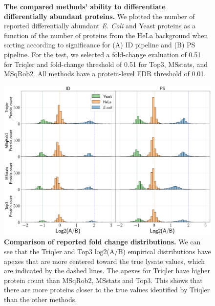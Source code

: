 \documentclass[11pt]{article}
\begin{document}
\begin{figure}[hbt]
\begin{tabular}{lclc}
    \end{tabular}
    \caption{{\bf The compared methods' ability to differentiate differentially abundant proteins.} We plotted the number of reported differentially abundant  {\em E. Coli} and Yeast proteins as a function of the number of proteins from the HeLa background when sorting according to significance for (A) ID pipeline and (B) PS pipeline. For the test, we selected a fold-change evaluation of 0.51 for Triqler and fold-change threshold of 0.51 for Top3, MSstats, and MSqRob2. All methods have a protein-level FDR threshold of 0.01. \label{fig:ability_to_differentiate_differentially_abundant_specie_vs_hela}}
\end{figure}


\begin{figure}[hbt]
    \centering
    \setlength{\tabcolsep}{0pt}

    \includegraphics[width=\linewidth]{../../result/report_plots/gridplot_histogram.png} 


    \caption{{\bf Comparison of reported fold change distributions.} We can see that the Triqler and Top3 log2(A/B) empirical distributions have apexes that are more centered toward the true lysate values, which are indicated by the dashed lines. The apexes for Triqler have higher protein count than MSqRob2, MSstats and Top3. This shows that there are more proteins closer to the true values identified by Triqler than the other methods. \label{fig:fc_histogram_supplement}}
    
\end{figure}
\end{document}
